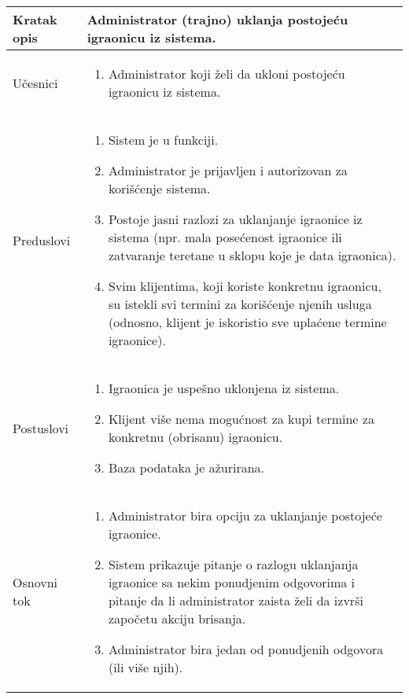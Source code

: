 \documentclass[../main.tex]{subfiles}
\begin{document}
\begin{longtable}{| p{} | p{} |} 

\hline
    Kratak opis &  Administrator (trajno) uklanja postojeću igraonicu iz sistema. \\ 
\hline    
    Učesnici & 
    	\begin{enumerate}
        \item Administrator koji želi da ukloni postojeću igraonicu iz sistema.
     \end{enumerate}\\
\hline
   Preduslovi & \begin{enumerate}
       \item Sistem je u funkciji.
       \item Administrator je prijavljen i autorizovan za korišćenje sistema.
       \item Postoje jasni razlozi za uklanjanje igraonice iz sistema (npr. mala posećenost igraonice ili zatvaranje teretane u sklopu koje je data igraonica).
       \item Svim klijentima, koji koriste konkretnu igraonicu, su istekli svi termini za korišćenje njenih usluga (odnosno, klijent je iskoristio sve uplaćene termine igraonice).
   \end{enumerate}\\
\hline  
    Postuslovi & \begin{enumerate}
        \item Igraonica je uspešno uklonjena iz sistema.
        \item Klijent više nema mogućnost za kupi termine za konkretnu (obrisanu) igraonicu.
        \item Baza podataka je ažurirana.
    \end{enumerate}\\
\hline
    Osnovni tok & \begin{enumerate}
        \item Administrator bira opciju za uklanjanje postojeće igraonice.
        \item Sistem prikazuje pitanje o razlogu uklanjanja igraonice sa nekim ponudjenim odgovorima i pitanje da li administrator zaista želi da izvrši započetu akciju brisanja.
        \item Administrator bira jedan od ponudjenih odgovora (ili više njih). 

\end{enumerate}
\end{longtable}
\end{document}
